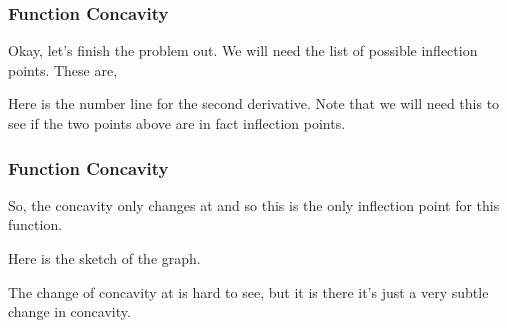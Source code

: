 \documentclass{beamer}
\begin{document}
\begin{frame} 
	\frametitle{Function Concavity}  
 Okay, let’s finish the problem out.  We will need the list of possible inflection points.  These are,
 
 Here is the number line for the second derivative.  Note that we will need this to see if the two points above are in fact inflection points.
 
\end{frame}
\begin{frame} 
	\frametitle{Function Concavity} 
 
 So, the concavity only changes at  and so this is the only inflection point for this function.
 
 Here is the sketch of the graph.
 
 The change of concavity at  is hard to see, but it is there it’s just a very subtle change in concavity.
 
\end{frame}
\end{document}
